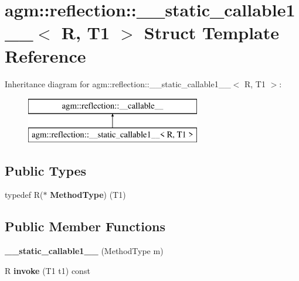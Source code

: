 \hypertarget{structagm_1_1reflection_1_1____static__callable1____}{}\section{agm\+:\+:reflection\+:\+:\+\_\+\+\_\+static\+\_\+callable1\+\_\+\+\_\+$<$ R, T1 $>$ Struct Template Reference}
\label{structagm_1_1reflection_1_1____static__callable1____}
Inheritance diagram for agm\+:\+:reflection\+:\+:\+\_\+\+\_\+static\+\_\+callable1\+\_\+\+\_\+$<$ R, T1 $>$\+:\begin{figure}[H]
\begin{center}
\leavevmode
\includegraphics[height=2.000000cm]{structagm_1_1reflection_1_1____static__callable1____}
\end{center}
\end{figure}
\subsection*{Public Types}
\begin{DoxyCompactItemize}
\item 
typedef R($\ast$ {\bfseries Method\+Type}) (T1)\hypertarget{structagm_1_1reflection_1_1____static__callable1_____a9c38e2e62d85bc4ad28350aad94e352e}{}\label{structagm_1_1reflection_1_1____static__callable1_____a9c38e2e62d85bc4ad28350aad94e352e}

\end{DoxyCompactItemize}
\subsection*{Public Member Functions}
\begin{DoxyCompactItemize}
\item 
{\bfseries \+\_\+\+\_\+static\+\_\+callable1\+\_\+\+\_\+} (Method\+Type m)\hypertarget{structagm_1_1reflection_1_1____static__callable1_____a2abce23b998869aa893af8300a443d94}{}\label{structagm_1_1reflection_1_1____static__callable1_____a2abce23b998869aa893af8300a443d94}

\item 
R {\bfseries invoke} (T1 t1) const \hypertarget{structagm_1_1reflection_1_1____static__callable1_____a6f0150349deac9fa9819f8be9f619694}{}\label{structagm_1_1reflection_1_1____static__callable1_____a6f0150349deac9fa9819f8be9f619694}

\end{DoxyCompactItemize}

